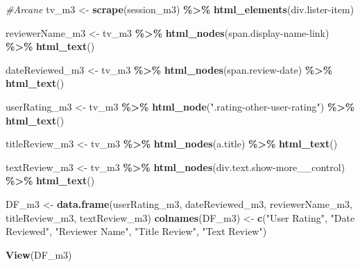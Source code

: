 \documentclass[
]{article}
\newenvironment{Shaded}{\begin{snugshade}}{\end{snugshade}}
\newcommand{\CommentTok}[1]{\textcolor[rgb]{0.56,0.35,0.01}{\textit{#1}}}
\newcommand{\FunctionTok}[1]{\textcolor[rgb]{0.13,0.29,0.53}{\textbf{#1}}}
\newcommand{\NormalTok}[1]{#1}
\newcommand{\OtherTok}[1]{\textcolor[rgb]{0.56,0.35,0.01}{#1}}
\newcommand{\SpecialCharTok}[1]{\textcolor[rgb]{0.81,0.36,0.00}{\textbf{#1}}}
\newcommand{\StringTok}[1]{\textcolor[rgb]{0.31,0.60,0.02}{#1}}
\begin{document}
\begin{Shaded}
\begin{Highlighting}[]
\CommentTok{\#Arcane }
\NormalTok{tv\_m3 }\OtherTok{\textless{}{-}} \FunctionTok{scrape}\NormalTok{(session\_m3) }\SpecialCharTok{\%\textgreater{}\%} 
  \FunctionTok{html\_elements}\NormalTok{(}\StringTok{\textquotesingle{}div.lister{-}item\textquotesingle{}}\NormalTok{)}

\NormalTok{reviewerName\_m3 }\OtherTok{\textless{}{-}}\NormalTok{ tv\_m3 }\SpecialCharTok{\%\textgreater{}\%}
  \FunctionTok{html\_nodes}\NormalTok{(}\StringTok{\textquotesingle{}span.display{-}name{-}link\textquotesingle{}}\NormalTok{) }\SpecialCharTok{\%\textgreater{}\%}
  \FunctionTok{html\_text}\NormalTok{()}

\NormalTok{dateReviewed\_m3 }\OtherTok{\textless{}{-}}\NormalTok{ tv\_m3 }\SpecialCharTok{\%\textgreater{}\%}
  \FunctionTok{html\_nodes}\NormalTok{(}\StringTok{\textquotesingle{}span.review{-}date\textquotesingle{}}\NormalTok{) }\SpecialCharTok{\%\textgreater{}\%}
  \FunctionTok{html\_text}\NormalTok{()}

\NormalTok{userRating\_m3 }\OtherTok{\textless{}{-}}\NormalTok{ tv\_m3 }\SpecialCharTok{\%\textgreater{}\%} 
  \FunctionTok{html\_node}\NormalTok{(}\StringTok{".rating{-}other{-}user{-}rating"}\NormalTok{) }\SpecialCharTok{\%\textgreater{}\%} 
  \FunctionTok{html\_text}\NormalTok{()}

\NormalTok{titleReview\_m3 }\OtherTok{\textless{}{-}}\NormalTok{ tv\_m3 }\SpecialCharTok{\%\textgreater{}\%}
  \FunctionTok{html\_nodes}\NormalTok{(}\StringTok{\textquotesingle{}a.title\textquotesingle{}}\NormalTok{) }\SpecialCharTok{\%\textgreater{}\%}
  \FunctionTok{html\_text}\NormalTok{()}

\NormalTok{textReview\_m3 }\OtherTok{\textless{}{-}}\NormalTok{ tv\_m3 }\SpecialCharTok{\%\textgreater{}\%}
  \FunctionTok{html\_nodes}\NormalTok{(}\StringTok{\textquotesingle{}div.text.show{-}more\_\_control\textquotesingle{}}\NormalTok{) }\SpecialCharTok{\%\textgreater{}\%}
  \FunctionTok{html\_text}\NormalTok{()}

\NormalTok{DF\_m3 }\OtherTok{\textless{}{-}} \FunctionTok{data.frame}\NormalTok{(userRating\_m3, dateReviewed\_m3, reviewerName\_m3, titleReview\_m3, textReview\_m3)}
\FunctionTok{colnames}\NormalTok{(DF\_m3) }\OtherTok{\textless{}{-}} \FunctionTok{c}\NormalTok{(}\StringTok{"User Rating"}\NormalTok{, }\StringTok{"Date Reviewed"}\NormalTok{, }\StringTok{"Reviewer Name"}\NormalTok{, }\StringTok{"Title Review"}\NormalTok{, }\StringTok{"Text Review"}\NormalTok{)}

\FunctionTok{View}\NormalTok{(DF\_m3)}


\end{Highlighting}
\end{Shaded}
\end{document}
